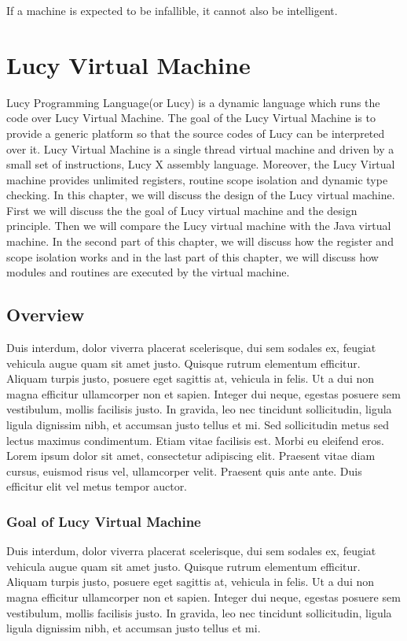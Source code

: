 \begin{savequote}[75mm]
If a machine is expected to be infallible, it cannot also be intelligent.
\end{savequote}

\chapter{Lucy Virtual Machine}
Lucy Programming Language(or Lucy) is a dynamic language which runs the code over Lucy Virtual Machine. The goal of the Lucy Virtual Machine is to provide a generic platform so that the source codes of Lucy can be interpreted over it. Lucy Virtual Machine is a single thread virtual machine and driven by a small set of instructions, Lucy X assembly language. Moreover, the Lucy Virtual machine provides unlimited registers, routine scope isolation and dynamic type checking. In this chapter, we will discuss the design of the Lucy virtual machine. First we will discuss the the goal of Lucy virtual machine and the design principle. Then we will compare the Lucy virtual machine with the Java virtual machine. In the second part of this chapter, we will discuss how the register and scope isolation works and in the last part of this chapter, we will discuss how modules and routines are executed by the virtual machine.

\section{Overview}
Duis interdum, dolor viverra placerat scelerisque, dui sem sodales ex, feugiat vehicula augue quam sit amet justo. Quisque rutrum elementum efficitur. Aliquam turpis justo, posuere eget sagittis at, vehicula in felis. Ut a dui non magna efficitur ullamcorper non et sapien. Integer dui neque, egestas posuere sem vestibulum, mollis facilisis justo. In gravida, leo nec tincidunt sollicitudin, ligula ligula dignissim nibh, et accumsan justo tellus et mi. Sed sollicitudin metus sed lectus maximus condimentum. Etiam vitae facilisis est. Morbi eu eleifend eros. Lorem ipsum dolor sit amet, consectetur adipiscing elit. Praesent vitae diam cursus, euismod risus vel, ullamcorper velit. Praesent quis ante ante. Duis efficitur elit vel metus tempor auctor.

\subsection{Goal of Lucy Virtual Machine}
Duis interdum, dolor viverra placerat scelerisque, dui sem sodales ex, feugiat vehicula augue quam sit amet justo. Quisque rutrum elementum efficitur. Aliquam turpis justo, posuere eget sagittis at, vehicula in felis. Ut a dui non magna efficitur ullamcorper non et sapien. Integer dui neque, egestas posuere sem vestibulum, mollis facilisis justo. In gravida, leo nec tincidunt sollicitudin, ligula ligula dignissim nibh, et accumsan justo tellus et mi.

